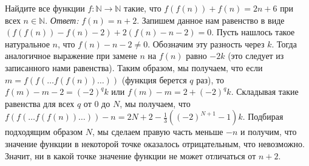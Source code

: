\problem
Найдите все функции $f \colon \mathbb{N} \to \mathbb{N}$ такие, что
$f(f(n)) + f(n) = 2 n + 6$ при всех $n \in \mathbb{N}$.
\solution
\emph{Ответ:} $f(n) = n + 2$.
Запишем данное нам равенство в виде
$(f(f(n)) - f(n) - 2) + 2 (f(n) - n - 2) = 0$.
Пусть нашлось такое натуральное $n$, что $f(n) - n - 2 \neq 0$.
Обозначим эту разность через $k$.
Тогда аналогичное выражение при замене $n$ на $f(n)$ равно $- 2 k$
(это следует из записанного нами равенства).
Таким образом, мы получаем, что если $m = f(f(\ldots f(f(n)) \ldots))$
(функция берется $q$ раз), то $f(m) - m - 2 = (-2)^q k$ или
$f(m) - m = 2 + (-2)^q k$.
Складывая такие равенства для всех $q$ от $0$ до $N$, мы получаем, что
$f(f(\ldots f(f(n)) \ldots)) - n = 2 N + 2 - \frac{1}{3} ((-2)^{N+1} - 1) k$.
Подбирая подходящим образом $N$, мы сделаем правую часть меньше $-n$ и получим,
что значение функции в некоторой точке оказалось отрицательным, что невозможно.
Значит, ни в какой точке значение функции не может отличаться от $n + 2$.
\endproblem
